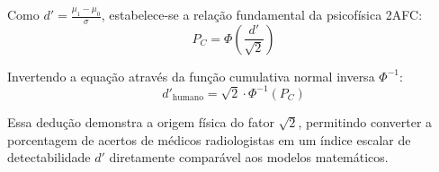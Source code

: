 Como $d' = \frac{\mu_1 - \mu_0}{\sigma}$, estabelece-se a relação fundamental da psicofísica 2AFC:
\begin{equation}
  P_C = \Phi\left( \frac{d'}{\sqrt{2}} \right)
  \label{eq:pc_dprime_2afc}
\end{equation}

Invertendo a equação através da função cumulativa normal inversa $\Phi^{-1}$:
\begin{equation}
  d'_{\text{humano}} = \sqrt{2} \cdot \Phi^{-1}(P_C)
  \label{eq:dprime_humano_inversa}
\end{equation}

Essa dedução demonstra a origem física do fator $\sqrt{2}$, permitindo converter a porcentagem de acertos de médicos radiologistas em um índice escalar de detectabilidade $d'$ diretamente comparável aos modelos matemáticos.

